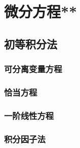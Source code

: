 \chapter{微分方程**}
\section{初等积分法}
\subsection{可分离变量方程}
\clearpage
\subsection{恰当方程}
\clearpage
\subsection{一阶线性方程}
\clearpage
\subsection{积分因子法}

\clearpage
